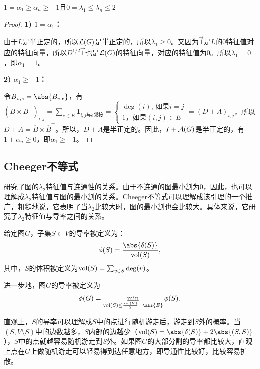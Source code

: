 \begin{lemma}
    $1=\alpha_1\geq\alpha_n\geq-1$且$0=\lambda_1\leq\lambda_n\leq2$
\end{lemma}
\begin{proof}
\textbf{1) $1=\alpha_1$：}
    
由于$L$是半正定的，所以$\mathcal{L}(G)$是半正定的，所以$\lambda_1\geq0$。又因为$\overrightarrow{1}$是$L$的$0$特征值对应的特征向量，所以$D^{1/2}\overrightarrow{1}$也是$\mathcal{L}(G)$的特征向量，对应的特征值为$0$。所以$\lambda_1=0$，即$\alpha_1=1$。

\textbf{2) $\alpha_1\geq-1$：}

令$\overline{B}_{v,e}=\abs{B_{v,e}}$，有$(\overline{B}\times\overline{B}^{\top})_{i,j}=\sum_{e\in E}\mathbf{1}_{i,j\text{与$e$邻接}}=\begin{cases}
    \deg(i)\text{, 如果$i=j$}\\
    1\text{，如果$(i,j)\in E$}
\end{cases}=(D+A)_{i,j}$，所以$D+A=\overline{B}\times\overline{B}^{\top}$。所以，$D+A$是半正定的。因此，$I+\mathcal{A}(G)$是半正定的，有$1+\alpha_n\geq0$，即$\alpha_1\geq-1$。
\end{proof}

\subsection{Cheeger不等式}

研究了图的$\lambda_2$特征值与连通性的关系。由于不连通的图最小割为$0$，因此，也可以理解成$\lambda_2$特征值与图的最小割的关系。Cheeger不等式可以理解成该引理的一个推广，粗糙地说，它表明了当$\lambda_2$比较大时，图的最小割也会比较大。具体来说，它研究了$\lambda_2$特征值与导率之间的关系。

\begin{definition}[导率（conductance）]
    给定图$G$，子集$S\subset V$的导率被定义为：
    \[\phi(S)=\frac{\abs{\delta(S)}}{\vol(S)},\]
    其中，$S$的体积被定义为$\mathrm{vol}(S)=\sum_{v\in S}\deg(v)$。

    进一步地，图$G$的导率被定义为\[\phi(G)=\min_{\vol(S)\leq\frac{\vol(V)}{2}=\abs{E}}\phi(S).\]
\end{definition}

直观上，$S$的导率可以理解成$S$中的点进行随机游走后，游走到$S$外的概率。当$(S,V\setminus S)$中的边数越多，$S$内部的边越少（$\vol(S)=\abs{\delta(S)}+2\abs{(S,S)}$），$S$中的点就越容易随机游走到$S$外。如果图$G$的大部分割的导率都比较大，直观上点在$G$上做随机游走可以轻易得到达任意地方，即导通性比较好，比较容易扩散。

